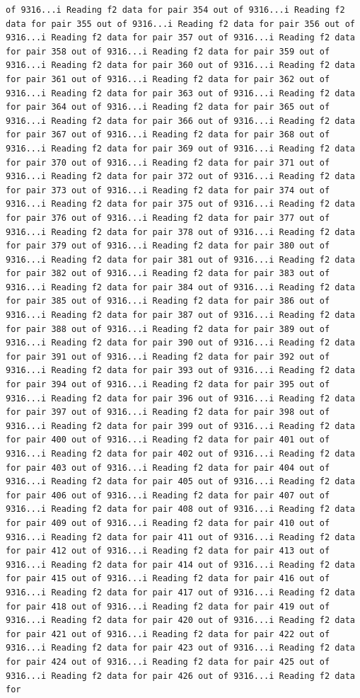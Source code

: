 \documentclass[
]{article}
\begin{document}
\begin{verbatim}
of 9316...i Reading f2 data for pair 354 out of 9316...i Reading f2 data for pair 355 out of 9316...i Reading f2 data for pair 356 out of 9316...i Reading f2 data for pair 357 out of 9316...i Reading f2 data for pair 358 out of 9316...i Reading f2 data for pair 359 out of 9316...i Reading f2 data for pair 360 out of 9316...i Reading f2 data for pair 361 out of 9316...i Reading f2 data for pair 362 out of 9316...i Reading f2 data for pair 363 out of 9316...i Reading f2 data for pair 364 out of 9316...i Reading f2 data for pair 365 out of 9316...i Reading f2 data for pair 366 out of 9316...i Reading f2 data for pair 367 out of 9316...i Reading f2 data for pair 368 out of 9316...i Reading f2 data for pair 369 out of 9316...i Reading f2 data for pair 370 out of 9316...i Reading f2 data for pair 371 out of 9316...i Reading f2 data for pair 372 out of 9316...i Reading f2 data for pair 373 out of 9316...i Reading f2 data for pair 374 out of 9316...i Reading f2 data for pair 375 out of 9316...i Reading f2 data for pair 376 out of 9316...i Reading f2 data for pair 377 out of 9316...i Reading f2 data for pair 378 out of 9316...i Reading f2 data for pair 379 out of 9316...i Reading f2 data for pair 380 out of 9316...i Reading f2 data for pair 381 out of 9316...i Reading f2 data for pair 382 out of 9316...i Reading f2 data for pair 383 out of 9316...i Reading f2 data for pair 384 out of 9316...i Reading f2 data for pair 385 out of 9316...i Reading f2 data for pair 386 out of 9316...i Reading f2 data for pair 387 out of 9316...i Reading f2 data for pair 388 out of 9316...i Reading f2 data for pair 389 out of 9316...i Reading f2 data for pair 390 out of 9316...i Reading f2 data for pair 391 out of 9316...i Reading f2 data for pair 392 out of 9316...i Reading f2 data for pair 393 out of 9316...i Reading f2 data for pair 394 out of 9316...i Reading f2 data for pair 395 out of 9316...i Reading f2 data for pair 396 out of 9316...i Reading f2 data for pair 397 out of 9316...i Reading f2 data for pair 398 out of 9316...i Reading f2 data for pair 399 out of 9316...i Reading f2 data for pair 400 out of 9316...i Reading f2 data for pair 401 out of 9316...i Reading f2 data for pair 402 out of 9316...i Reading f2 data for pair 403 out of 9316...i Reading f2 data for pair 404 out of 9316...i Reading f2 data for pair 405 out of 9316...i Reading f2 data for pair 406 out of 9316...i Reading f2 data for pair 407 out of 9316...i Reading f2 data for pair 408 out of 9316...i Reading f2 data for pair 409 out of 9316...i Reading f2 data for pair 410 out of 9316...i Reading f2 data for pair 411 out of 9316...i Reading f2 data for pair 412 out of 9316...i Reading f2 data for pair 413 out of 9316...i Reading f2 data for pair 414 out of 9316...i Reading f2 data for pair 415 out of 9316...i Reading f2 data for pair 416 out of 9316...i Reading f2 data for pair 417 out of 9316...i Reading f2 data for pair 418 out of 9316...i Reading f2 data for pair 419 out of 9316...i Reading f2 data for pair 420 out of 9316...i Reading f2 data for pair 421 out of 9316...i Reading f2 data for pair 422 out of 9316...i Reading f2 data for pair 423 out of 9316...i Reading f2 data for pair 424 out of 9316...i Reading f2 data for pair 425 out of 9316...i Reading f2 data for pair 426 out of 9316...i Reading f2 data for 
\end{verbatim}
\end{document}
